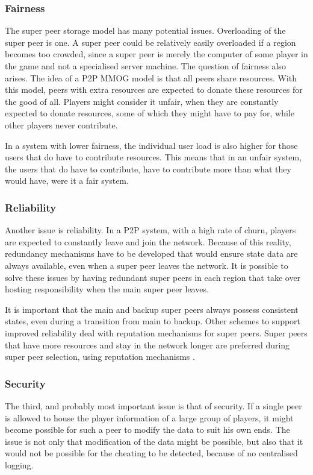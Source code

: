 \documentclass[10pt,a4paper,journal,cspaper,compsoc]{IEEEtran}
\begin{document}
\subsubsection{Fairness}
The super peer storage model has many potential issues. Overloading of the super peer is one. A super peer could be relatively easily overloaded if a
region becomes too crowded, since a super peer is merely the computer of some player in the game and not a specialised server machine. The question
of fairness also arises. The idea of a P2P MMOG model is that all peers share resources. With this model, peers with extra resources are expected to
donate these resources for the good of all. Players might consider it unfair, when they are constantly expected to donate resources, some of which
they might have to pay for, while other players never contribute.

In a system with lower fairness, the individual user load is also higher for those users that do have to contribute resources. This means that in an
unfair system, the users that do have to contribute, have to contribute more than what they would have, were it a fair system.

\subsubsection{Reliability}
\label{super_peer_storage_reliability}

Another issue is reliability. In a P2P system, with a high rate of churn, players are expected to constantly leave and join the network. Because of
this reality, redundancy mechanisms have to be developed that would ensure state data are always available, even when a super peer leaves the
network. It is possible to solve these issues by having redundant super peers in each region that take over hosting responsibility when the main
super peer leaves.

It is important that the main and backup super peers always possess consistent states, even during a transition from main to backup. Other schemes to
support improved reliability deal with reputation mechanisms for super peers. Super peers that have more resources and stay in the network longer are
preferred during super peer selection, using reputation mechanisms \cite{fan_mediator_paper}.

\subsubsection{Security}
The third, and probably most important issue is that of security. If a single peer is allowed to house the player information of a large group of
players, it might become possible for such a peer to modify the data to suit his own ends. The issue is not only that modification of the data might
be possible, but also that it would not be possible for the cheating to be detected, because of no centralised logging.
\end{document}
